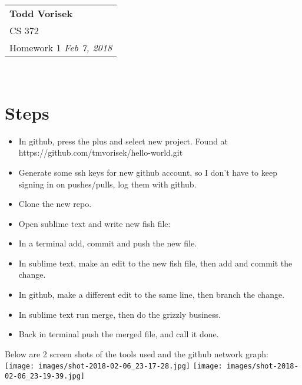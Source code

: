 \documentclass{article}
\begin{document}
  \null\hfill\begin{tabular}[t]{l@{}}
  \textbf{Todd Vorisek} \\
  CS 372 \\
  Homework 1
  \textit{Feb 7, 2018} \\
  \end{tabular}\\

  \section*{Steps}
    \begin{itemize}
      \item In github, press the plus and select new project. Found at https://github.com/tmvorisek/hello-world.git
      \item Generate some ssh keys for new github account, so I don't have to keep signing in on pushes/pulls, log them with github.  
      \item Clone the new repo. 
      \item Open sublime text and write new fish file:\\ 
      \item In a terminal add, commit and push the new file.
      \item In sublime text, make an edit to the new fish file, then add and commit the change.
      \item In github, make a different edit to the same line, then branch the change.
      \item In sublime text run merge, then do the grizzly business.
      \item Back in terminal push the merged file, and call it done.
    \end{itemize}
    Below are 2  screen shots of the tools used and the github network graph:\\
    \texttt{[image: images/shot-2018-02-06\_23-17-28.jpg]}
    \texttt{[image: images/shot-2018-02-06\_23-19-39.jpg]}
\end{document}
